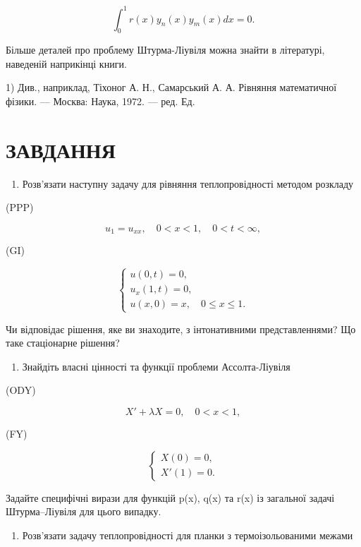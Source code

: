 \documentclass[
  ukrainian,
]{article}
\providecommand{\tightlist}{%
  \setlength{\itemsep}{0pt}\setlength{\parskip}{0pt}}
\begin{document}
\[
\int_{0}^{1} r(x) y_{n}(x) y_{m}(x) dx = 0.
\]

Більше деталей про проблему Штурма-Ліувіля можна знайти в літературі,
наведеній наприкінці книги.

1) Див., наприклад, Тіхоног А. Н., Самарський А. А. Рівняння
математичної фізики. --- Москва: Наука, 1972. --- ред. Ед.

\section{ЗАВДАННЯ}\label{ux437ux430ux432ux434ux430ux43dux43dux44f-4}

\begin{enumerate}
\def\labelenumi{\arabic{enumi}.}
\tightlist
\item
  Розв'язати наступну задачу для рівняння теплопровідності методом
  розкладу
\end{enumerate}

(PPP)

\[
u_1 = u_{xx}, \quad 0 < x < 1, \quad 0 < t < \infty,
\]

(GI)

\[
\begin{cases} u(0, t) = 0, \\ u_x(1, t) = 0, \\ u(x, 0) = x, \quad 0 \le x \le 1. \end{cases}
\]

Чи відповідає рішення, яке ви знаходите, з інтонативними
представленнями? Що таке стаціонарне рішення?

\begin{enumerate}
\def\labelenumi{\arabic{enumi}.}
\setcounter{enumi}{1}
\tightlist
\item
  Знайдіть власні цінності та функції проблеми Ассолта-Ліувіля
\end{enumerate}

(ODY)

\[
X' + \lambda X = 0, \quad 0 < x < 1,
\]

(FY)

\[
\begin{cases} X(0) = 0, \\ X'(1) = 0. \end{cases}
\]

Задайте специфічні вирази для функцій p(x), q(x) та r(x) із загальної
задачі Штурма--Ліувіля для цього випадку.

\begin{enumerate}
\def\labelenumi{\arabic{enumi}.}
\setcounter{enumi}{2}
\tightlist
\item
  Розв'язати задачу теплопровідності для планки з термоізольованими
  межами
\end{enumerate}
\end{document}
